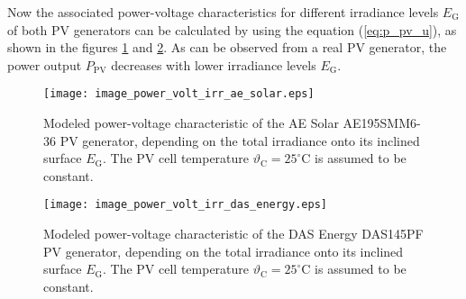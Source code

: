 Now the associated power-voltage characteristics for different irradiance levels $E_\mathrm{G}$ of both PV generators can be calculated by using the equation (\ref{eq:p_pv_u}), as shown in the figures \ref{fig:image_power_volt_irr_ae_solar} and \ref{fig:image_power_volt_irr_das_energy}. As can be observed from a real PV generator, the power output $P_\mathrm{PV}$ decreases with lower irradiance levels $E_\mathrm{G}$. 
\begin{figure}[h!]
	\centering
  	\texttt{[image: image\_power\_volt\_irr\_ae\_solar.eps]}
  	\caption{Modeled power-voltage characteristic of the AE Solar AE195SMM6-36 PV generator, depending on the total irradiance onto its inclined surface $E_\mathrm{G}$. The PV cell temperature $\vartheta_\mathrm{C} = 25^\circ\mathrm{C}$ is assumed to be constant.}
	\label{fig:image_power_volt_irr_ae_solar}
\end{figure}
\begin{figure}[h!]
	\centering
  	\texttt{[image: image\_power\_volt\_irr\_das\_energy.eps]}
  	\caption{Modeled power-voltage characteristic of the DAS Energy DAS145PF PV generator, depending on the total irradiance onto its inclined surface $E_\mathrm{G}$. The PV cell temperature $\vartheta_\mathrm{C} = 25^\circ\mathrm{C}$ is assumed to be constant.}
	\label{fig:image_power_volt_irr_das_energy}
\end{figure}

